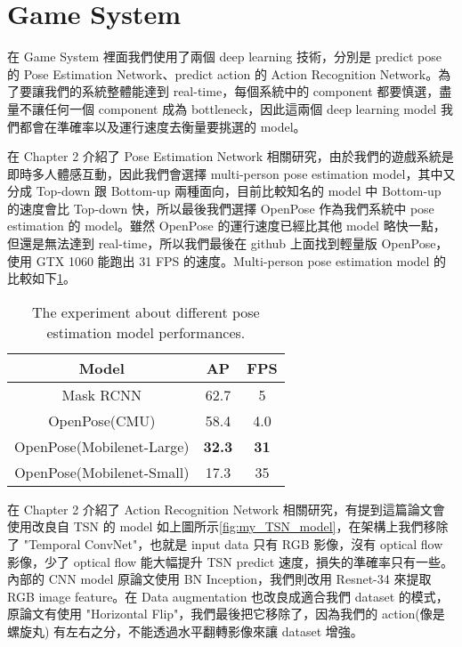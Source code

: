 \section{Game System}

在 Game System 裡面我們使用了兩個 deep learning 技術，分別是 predict pose 的 Pose Estimation Network、predict action 的 Action Recognition Network。為了要讓我們的系統整體能達到 real-time，每個系統中的 component 都要慎選，盡量不讓任何一個 component 成為 bottleneck，因此這兩個 deep learning model 我們都會在準確率以及運行速度去衡量要挑選的 model。

在 Chapter 2 介紹了 Pose Estimation Network 相關研究，由於我們的遊戲系統是即時多人體感互動，因此我們會選擇 multi-person pose estimation model，其中又分成 Top-down 跟 Bottom-up 兩種面向，目前比較知名的 model 中 Bottom-up 的速度會比 Top-down 快，所以最後我們選擇 OpenPose 作為我們系統中 pose estimation 的 model。雖然 OpenPose 的運行速度已經比其他 model 略快一點，但還是無法達到 real-time，所以我們最後在 github 上面找到輕量版 OpenPose，使用 GTX 1060 能跑出 31 FPS 的速度。Multi-person pose estimation model 的比較如下\ref{tab:pose_estimation_model}。

\begin{table}[htbp]
	\caption{The experiment about different pose estimation model performances.}
	\label{tab:pose_estimation_model}
	\begin{center}
		\begin{tabular}{c|c|c}
			\hline \hline
			Model & AP & FPS\\
			\hline
			Mask RCNN & 62.7 & 5 \\
			OpenPose(CMU) & 58.4 & 4.0 \\
			OpenPose(Mobilenet-Large) & \textbf{32.3} & \textbf{31}\\
			OpenPose(Mobilenet-Small) & 17.3 & 35 \\
			\hline \hline						
		\end{tabular}
	\end{center}
\end{table}


在 Chapter 2 介紹了 Action Recognition Network 相關研究，有提到這篇論文會使用改良自 TSN 的 model 如上圖所示\ref{fig:my_TSN_model}，在架構上我們移除了 "Temporal ConvNet"，也就是 input data 只有 RGB 影像，沒有 optical flow 影像，少了 optical flow 能大幅提升 TSN predict 速度，損失的準確率只有一些。內部的 CNN model 原論文使用 BN Inception，我們則改用 Resnet-34 來提取 RGB image feature。在 Data augmentation 也改良成適合我們 dataset 的模式，原論文有使用 "Horizontal Flip"，我們最後把它移除了，因為我們的 action(像是螺旋丸) 有左右之分，不能透過水平翻轉影像來讓 dataset 增強。

\EndChapter

